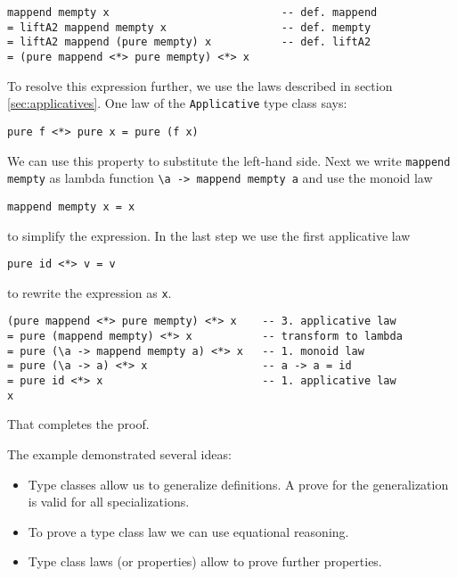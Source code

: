 \begin{verbatim}
mappend mempty x                           -- def. mappend
= liftA2 mappend mempty x                  -- def. mempty
= liftA2 mappend (pure mempty) x           -- def. liftA2
= (pure mappend <*> pure mempty) <*> x
\end{verbatim}

To resolve this expression further, we use the laws described in section \ref{sec:applicatives}.
One law of the \verb|Applicative| type class says:
\begin{verbatim}
pure f <*> pure x = pure (f x)
\end{verbatim}
We can use this property to substitute the left-hand side. Next we write \verb|mappend mempty| as lambda function \verb|\a -> mappend mempty a| and use the monoid law
\begin{verbatim}
mappend mempty x = x
\end{verbatim}
to simplify the expression. In the last step we use the first applicative law
\begin{verbatim}
pure id <*> v = v
\end{verbatim}
 to rewrite the expression as \verb|x|.
\begin{verbatim}
(pure mappend <*> pure mempty) <*> x    -- 3. applicative law
= pure (mappend mempty) <*> x           -- transform to lambda
= pure (\a -> mappend mempty a) <*> x   -- 1. monoid law 
= pure (\a -> a) <*> x                  -- a -> a = id
= pure id <*> x                         -- 1. applicative law
x
\end{verbatim}

That completes the proof.

The example demonstrated several ideas:
\begin{itemize}
\item Type classes allow us to generalize definitions. A prove for the generalization is valid for all specializations.
\item To prove a type class law we can use equational reasoning.
\item Type class laws (or properties) allow to prove further properties.
\end{itemize}


